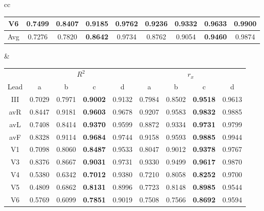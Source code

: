 \begin{table}[t!]
\begin{center}
\begin{tabular}{cc}
{\begin{footnotesize}
\begin{tabular}{|c|cccc|cccc|}
V6 & 0.7499 & 0.8407 & \textbf{0.9185} & 0.9762 & 0.9236 & 0.9332 & \textbf{0.9633} & 0.9900
  \\

\hline

Avg & 0.7276 & 0.7820 & \textbf{0.8642} & 0.9734 & 0.8762  & 0.9054 & \textbf{0.9460} & 0.9874 \\

\hline
\end{tabular}
\end{footnotesize}
}
&
{
\begin{footnotesize}
\begin{tabular}{|c|cccc|cccc|}
\hline

\cline{2-9}
& \multicolumn{4}{c|}{$R^2$}
& \multicolumn{4}{c|}{$r_x$} \\
\cline{2-9}

Lead & a & b & c & d & a & b & c & d \\
\hline
III & 0.7029 & 0.7971 & \textbf{0.9002} & 0.9132 & 0.7984 & 0.8502 & \textbf{0.9518} & 0.9613
  \\

avR & 0.8447 & 0.9181 & \textbf{0.9603} & 0.9678 & 0.9207 & 0.9583 & \textbf{0.9832} & 0.9885
  \\

avL & 0.7408 & 0.8414 & \textbf{0.9370} & 0.9599 & 0.8872 & 0.9334 & \textbf{0.9731} & 0.9799
  \\

avF & 0.8328 & 0.9114 & \textbf{0.9684} & 0.9744 & 0.9158 & 0.9593 & \textbf{0.9885} & 0.9944
  \\

V1 & 0.7098 & 0.8060 & \textbf{0.8487} & 0.9533 & 0.8047 & 0.9012 & \textbf{0.9378} & 0.9767
  \\

V3 & 0.8376 & 0.8667 & \textbf{0.9031} & 0.9731 & 0.9330 & 0.9499 & \textbf{0.9617} & 0.9870
  \\

V4 & 0.5380 & 0.6342 & \textbf{0.7012} & 0.9380 & 0.7210 & 0.8058 & \textbf{0.8252} & 0.9700
  \\

V5 & 0.4809 & 0.6862 & \textbf{0.8131} & 0.8996 & 0.7723 & 0.8148 & \textbf{0.8985} & 0.9544
  \\

V6 & 0.5769 & 0.6099 & \textbf{0.7851} & 0.9019 & 0.7508 & 0.7566 & \textbf{0.8692} & 0.9594
  \\


\end{tabular}
\end{footnotesize}}
\end{tabular}
\end{center}
\end{table}
